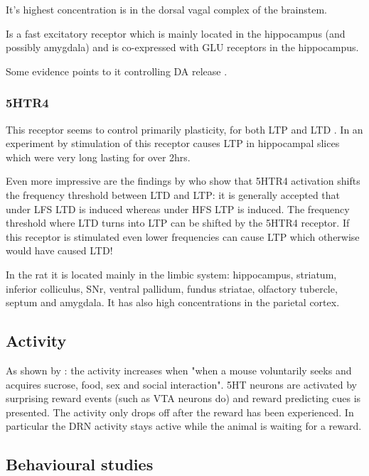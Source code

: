 \documentclass[12pt,a4paper]{article}
\begin{document}
It's highest concentration is in the dorsal vagal complex of the brainstem. 

Is a fast excitatory receptor which is mainly located in the hippocampus (and possibly amygdala) \citep{Palacios1990} and is co-expressed with GLU receptors in the hippocampus.

Some evidence points to it controlling DA release \citep{Mengod2010}.

\subsubsection{5HTR4}

This receptor seems to control primarily plasticity, for both LTP and LTD \citep{Penas-Cazorla2015}. In an experiment by \citep{Mlinar2006} stimulation of this receptor causes LTP in hippocampal slices which were very long lasting for over 2hrs.

Even more impressive are the findings by \citep{Hagena2017} who show that 5HTR4 activation shifts the frequency threshold between LTD and LTP: it is generally accepted that under LFS LTD is induced whereas under HFS LTP is induced. The frequency threshold where LTD turns into LTP can be shifted by the 5HTR4 receptor. If this receptor is stimulated even lower frequencies can cause LTP which otherwise would have caused LTD!

In the rat it is located mainly in the limbic system: hippocampus, striatum, inferior colliculus, SNr, ventral pallidum, fundus striatae, olfactory tubercle, septum and amygdala. It has also high concentrations in the parietal cortex.




\subsection{Activity}

As shown by \citep{Li2016}: the activity increases when "when a mouse voluntarily seeks and acquires sucrose, food, sex and social interaction". 5HT neurons are activated by surprising reward events (such as VTA neurons do) and reward predicting cues is presented. The activity only drops off after the reward has been experienced. In particular the DRN activity stays active while the animal is waiting for a reward.

\subsection{Behavioural studies}
\end{document}
